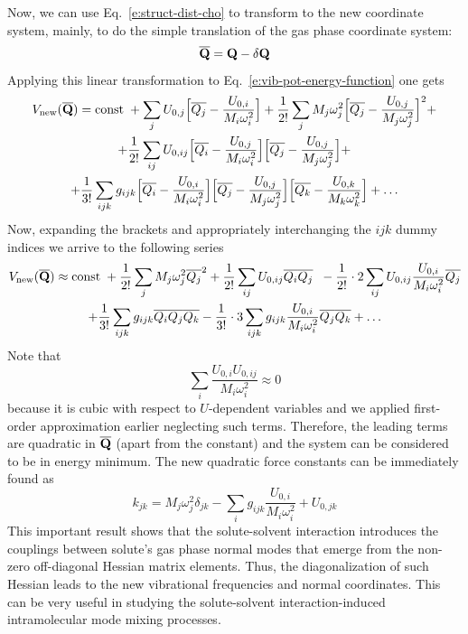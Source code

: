 \documentclass[a4paper,titlepage,twoside,fleqn,12pt]{book}
\begin{document}
\begin{refsection}
Now, we can use Eq.~\eqref{e:struct-dist-cho} to transform to the new coordinate system, mainly,
to do the simple translation of the gas phase coordinate system:
%
\begin{equation} \label{e:struct-dist-cho-transl}
\overline{\bf Q} = {\bf Q} - \delta {\bf Q}
\end{equation}
%
Applying this linear transformation to Eq.~\eqref{e:vib-pot-energy-function} one gets
%
\begin{multline}\label{exp}
V_{\rm new}(\overline{\bf Q}) = {\rm const}\;+\sum_j U_{0,j}\Big[\overline{Q_j}-\frac{U_{0,i}}{M_i\omega_i^2}\Big]
+ \frac{1}{2!} \sum_j M_j \omega_j^2 \Big[\overline{Q_j} - \frac{U_{0,j}}{M_j\omega_j^2}\Big]^2  +  \\
+ \frac{1}{2!} \sum_{ij} U_{0,ij} \Big[\overline{Q_i} - \frac{U_{0,j}}{M_i\omega_i^2}\Big] 
\Big[\overline{Q_j} - \frac{U_{0,j}}{M_j\omega_j^2}\Big] +  \\
+ \frac{1}{3!} \sum_{ijk} g_{ijk}  
\Big[\overline{Q_i} - \frac{U_{0,i}}{M_i\omega_i^2}\Big]
\Big[\overline{Q_j} - \frac{U_{0,j}}{M_j\omega_j^2}\Big]
\Big[\overline{Q_k} - \frac{U_{0,k}}{M_k\omega_k^2}\Big]  
+ \ldots
\end{multline}
%
Now, expanding the brackets and
appropriately interchanging the $ijk$ dummy indices we arrive to the following
series
%
\begin{multline}\label{exp2}
V_{\rm new}(\overline{\bf Q}) \approx {\rm const}\; 
+ \frac{1}{2!} \sum_j M_j \omega_j^2 \overline{Q_j}^2 
+ \frac{1}{2!} \sum_{ij} U_{0,ij} \overline{Q_i} \overline{Q_j} \;\;
 - \frac{1}{2!} \cdot 2 \sum_{ij} U_{0,ij} \frac{U_{0,i}}{M_i\omega_i^2} \overline{Q_j} \\
+ \frac{1}{3!} \sum_{ijk} g_{ijk} \overline{Q_i}\overline{Q_j}\overline{Q_k}  
- \frac{1}{3!} \cdot 3\sum_{ijk} g_{ijk} \frac{U_{0,i}}{M_i\omega_i^2} \overline{Q_j}\overline{Q_k} 
+ \ldots
\end{multline}
%
Note that
%
\begin{equation}
\sum_i \frac{ U_{0,i} U_{0,ij} }{M_i\omega_i^2}  \approx 0
\end{equation}
%
because it is cubic with respect to $U$\hyp{}dependent variables and we
applied first\hyp{}order approximation earlier neglecting such terms. 
Therefore, the leading terms are quadratic in $\overline{\bf Q}$
(apart from the constant) and the system can be considered to be in energy minimum.
The new quadratic force constants can be immediately found as
%
\begin{equation} \label{e:force-const-cho}
 k_{jk} = M_j \omega_j^2 \delta_{jk} - \sum_i g_{ijk} \frac{U_{0,i}}{M_i\omega_i^2} + U_{0,jk}
\end{equation}
%
This important result shows that the solute-solvent interaction
introduces the couplings between solute's gas phase
normal modes that emerge from the non\hyp{}zero off\hyp{}diagonal
Hessian matrix elements. Thus, the diagonalization of such
Hessian leads to the new vibrational frequencies and normal
coordinates. This can be very useful in studying the solute\hyp{}solvent 
interaction\hyp{}induced intramolecular mode
mixing processes.


\end{refsection}
\end{document}
